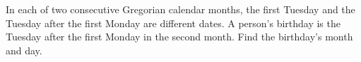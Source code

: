 In each of two consecutive Gregorian calendar months, the first Tuesday and the Tuesday after the first Monday are different dates. A person's birthday is the Tuesday after the first Monday in the second month. Find the birthday's month and day.

